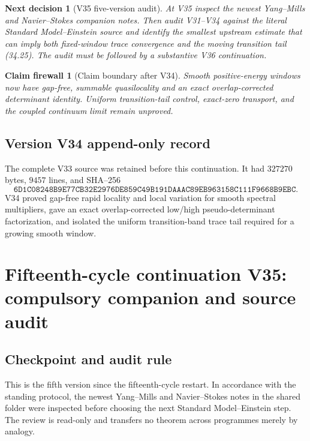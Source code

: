 \documentclass[11pt]{article}
\newtheorem{firewall}[theorem]{Claim firewall}
\newtheorem{decision}[theorem]{Next decision}
\theoremstyle{remark}
\begin{document}
\begin{decision}[V35 five-version audit]
\label{dec:v15v34-next}
At V35 inspect the newest Yang--Mills and Navier--Stokes companion
notes.  Then audit V31--V34 against the literal Standard
Model--Einstein source and identify the smallest upstream estimate
that can imply both fixed-window trace convergence and the moving
transition tail (34.25).  The audit must be followed by a
substantive V36 continuation.
\end{decision}

\begin{firewall}[Claim boundary after V34]
\label{fire:v15v34}
Smooth positive-energy windows now have gap-free, summable
quasilocality and an exact overlap-corrected determinant identity.
Uniform transition-tail control, exact-zero transport, and the
coupled continuum limit remain unproved.
\end{firewall}

\section*{Version V34 append-only record}
The complete V33 source was retained before this continuation.  It
had \(327270\) bytes, \(9457\) lines, and SHA--256
\[
 \texttt{6D1C08248B9E77CB32E2976DE859C49B191DAAAC89EB963158C111F9668B9EBC}.
\]
V34 proved gap-free rapid locality and local variation for smooth
spectral multipliers, gave an exact overlap-corrected low/high
pseudo-determinant factorization, and isolated the uniform
transition-band trace tail required for a growing smooth window.

\chapter{Fifteenth-cycle continuation V35: compulsory companion and source audit}
\label{sec:v15v35}

\section{Checkpoint and audit rule}

This is the fifth version since the fifteenth-cycle restart.  In
accordance with the standing protocol, the newest Yang--Mills and
Navier--Stokes notes in the shared folder were inspected before
choosing the next Standard Model--Einstein step.  The review is
read-only and transfers no theorem across programmes merely by
analogy.
\end{document}
